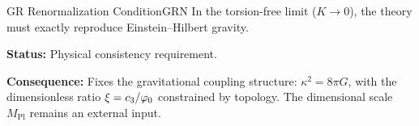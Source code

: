 \begin{axiom}{GR Renormalization Condition}{GRN}
In the torsion-free limit ($K \to 0$), the theory must exactly reproduce 
Einstein--Hilbert gravity.

\tcblower
\textbf{Status:} Physical consistency requirement.

\textbf{Consequence:} Fixes the gravitational coupling structure:
$\kappa^2 = 8\pi G$, with the dimensionless ratio $\xi = c_3/\varphi_0$ constrained by topology.
The dimensional scale $M_{\mathrm{Pl}}$ remains an external input.
\end{axiom}

